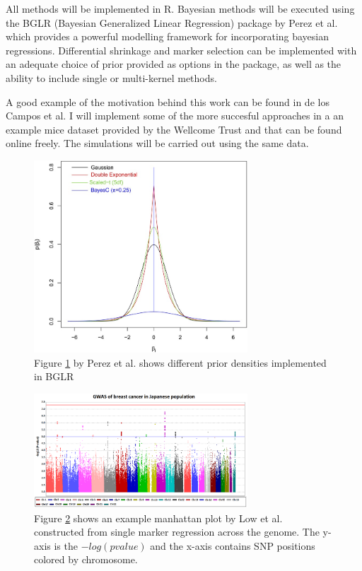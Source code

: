 \documentclass{sig-alternate-05-2015}
\begin{document}
All methods will be implemented in R. Bayesian methods will be executed using the BGLR (Bayesian Generalized Linear Regression) package by Perez et al.\cite{perez_genome-wide_2014} which provides a powerful modelling framework for incorporating bayesian regressions.
Differential shrinkage and marker selection can be implemented with an adequate choice of prior provided as options in the package, as well as the ability to include single or multi-kernel methods.

A good example of the motivation behind this work can be found in de los Campos et al. \cite{de_los_campos_predicting_2010} I will implement some of the more succesful approaches in a
an example mice dataset provided by the Wellcome Trust and that can be found online freely. The simulations will be carried out using the same data.

\begin{figure}
  \includegraphics[width=8cm]{./Images/BGLR.jpg}
  \centering
  \caption{Figure \ref{fig:BGLR} by Perez et al.\cite{perez_genome-wide_2014} shows different prior densities implemented in BGLR}
  \label{fig:BGLR}
\end{figure}

\begin{figure}
  \includegraphics[width=8cm]{./Images/manhattan_plot.png}
  \centering
  \caption{Figure \ref{fig:manhattan1} shows an example manhattan plot by Low et al.\cite{low_genome-wide_2013} constructed from single marker regression across the genome. The y-axis is
  the $ -log(pvalue) $ and the x-axis contains SNP positions colored by chromosome.}
  \label{fig:manhattan1}
\end{figure}
\end{document}

